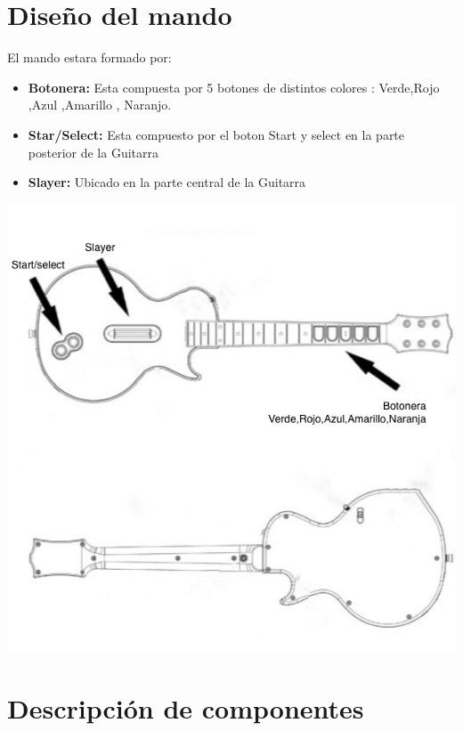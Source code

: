 \documentclass[12pt]{article}
\begin{document}
    
    
  
\newpage
\section{Diseño del mando}
    El mando estara formado por:
    \begin{itemize}
        \item \textbf{Botonera:}
        Esta compuesta por 5 botones de distintos colores : Verde,Rojo ,Azul ,Amarillo , Naranjo.
        \item \textbf{Star/Select:}
        Esta compuesto por el boton Start y select en la parte posterior de la Guitarra
         \item \textbf{Slayer:}
         Ubicado en la parte central de la Guitarra
    \end{itemize}

    
    \includegraphics[scale = 0.5]{diseno.png}\\[1.0 cm]
    \newpage
\section{Descripción de componentes}
\end{document}
